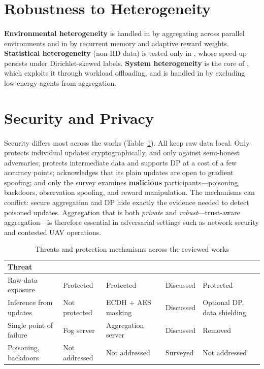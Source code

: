 \documentclass[12pt,a4paper,final]{extreport}
\begin{document}
\section{Robustness to Heterogeneity}

\paragraph{} \textbf{Environmental heterogeneity} is handled in \cite{p1} by aggregating across parallel environments and in \cite{p2} by recurrent memory and adaptive reward weights. \textbf{Statistical heterogeneity} (non-IID data) is tested only in \cite{p4}, whose speed-up persists under Dirichlet-skewed labels. \textbf{System heterogeneity} is the core of \cite{p4}, which exploits it through workload offloading, and is handled in \cite{p2} by excluding low-energy agents from aggregation.

\section{Security and Privacy}

\paragraph{} Security differs most across the works (Table~\ref{tab:cmp_security}). All keep raw data local. Only \cite{p2} protects individual updates cryptographically, and only against semi-honest adversaries; \cite{p4} protects intermediate data and supports DP at a cost of a few accuracy points; \cite{p1} acknowledges that its plain updates are open to gradient spoofing; and only the survey \cite{p3} examines \textbf{malicious} participants---poisoning, backdoors, observation spoofing, and reward manipulation. The mechanisms can conflict: secure aggregation and DP hide exactly the evidence needed to detect poisoned updates. Aggregation that is both \emph{private} and \emph{robust}---trust-aware aggregation---is therefore essential in adversarial settings such as network security and contested UAV operations.

{\renewcommand{\arraystretch}{1.15}
\begin{table}[htbp]
\centering
\caption{Threats and protection mechanisms across the reviewed works}\label{tab:cmp_security}
\small
\begin{tabularx}{\textwidth}{|p{3.1cm}|X|X|X|X|}
\hline
\textbf{Threat} & \textbf{\cite{p1}} & \textbf{\cite{p2}} & \textbf{\cite{p3}} & \textbf{\cite{p4}} \\ \hline
Raw-data exposure & Protected & Protected & Discussed & Protected \\ \hline
Inference from updates & Not protected & ECDH + AES masking & Discussed & Optional DP, data shielding \\ \hline
Single point of failure & Fog server & Aggregation server & Discussed & Removed \\ \hline
Poisoning, backdoors & Not addressed & Not addressed & Surveyed & Not addressed \\ \hline
\end{tabularx}
\end{table}}
\end{document}
